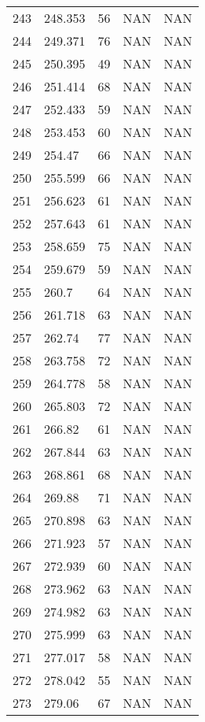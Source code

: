 \documentclass{article}
\begin{document}
\begin{longtable}{@{}lllll@{}}
				243 & 248.353 & 56    & NAN   & NAN   \\
				244 & 249.371 & 76    & NAN   & NAN   \\
				245 & 250.395 & 49    & NAN   & NAN   \\
				246 & 251.414 & 68    & NAN   & NAN   \\
				247 & 252.433 & 59    & NAN   & NAN   \\
				248 & 253.453 & 60    & NAN   & NAN   \\
				249 & 254.47  & 66    & NAN   & NAN   \\
				250 & 255.599 & 66    & NAN   & NAN   \\
				251 & 256.623 & 61    & NAN   & NAN   \\
				252 & 257.643 & 61    & NAN   & NAN   \\
				253 & 258.659 & 75    & NAN   & NAN   \\
				254 & 259.679 & 59    & NAN   & NAN   \\
				255 & 260.7   & 64    & NAN   & NAN   \\
				256 & 261.718 & 63    & NAN   & NAN   \\
				257 & 262.74  & 77    & NAN   & NAN   \\
				258 & 263.758 & 72    & NAN   & NAN   \\
				259 & 264.778 & 58    & NAN   & NAN   \\
				260 & 265.803 & 72    & NAN   & NAN   \\
				261 & 266.82  & 61    & NAN   & NAN   \\
				262 & 267.844 & 63    & NAN   & NAN   \\
				263 & 268.861 & 68    & NAN   & NAN   \\
				264 & 269.88  & 71    & NAN   & NAN   \\
				265 & 270.898 & 63    & NAN   & NAN   \\
				266 & 271.923 & 57    & NAN   & NAN   \\
				267 & 272.939 & 60    & NAN   & NAN   \\
				268 & 273.962 & 63    & NAN   & NAN   \\
				269 & 274.982 & 63    & NAN   & NAN   \\
				270 & 275.999 & 63    & NAN   & NAN   \\
				271 & 277.017 & 58    & NAN   & NAN   \\
				272 & 278.042 & 55    & NAN   & NAN   \\
				273 & 279.06  & 67    & NAN   & NAN   \\

\end{longtable}
\end{document}
